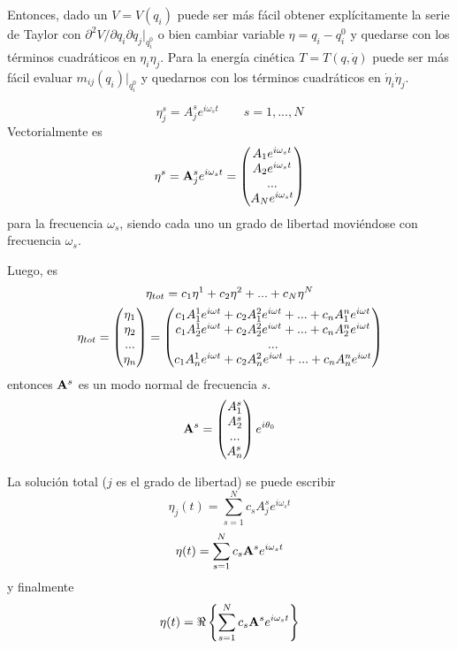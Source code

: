 \documentclass[10pt,oneside]{CBFT_book}
\begin{document}
Entonces, dado un $V=V(q_i)$ puede ser más fácil obtener explícitamente la serie de Taylor con 
$\partial^2 V/ \partial q_i \partial q_j |_{q_i^0}$ o bien cambiar variable $\eta = q_i - q_i^0$ y quedarse
con los términos cuadráticos en $\eta_i \eta_j$. Para la energía cinética $T=T(q,\dot{q})$ puede ser más
fácil evaluar $m_{ij}(q_i)|_{q_i^0}$ y quedarnos con los términos cuadráticos en $\dot{\eta}_i \dot{\eta}_j$.

\[
	\eta_j^s = A_j^s e^{i\omega_s t}	 \qquad s=1,...,N
\]
Vectorialmente es 
\[
	\vb{\eta}^s = \vb{A}_j^s e^{i\omega_s t} = \begin{pmatrix}
	                A_1 e^{i\omega_s t} \\
	                A_2 e^{i\omega_s t} \\
	                ... \\
	                A_N e^{i\omega_s t} \\
	               \end{pmatrix}
\]
para la frecuencia $\omega_s$, siendo cada uno un grado de libertad moviéndose con frecuencia $\omega_s$.

Luego, es
\[
	\vb{\eta}_{tot} = c_1 \vb{\eta}^1 + c_2 \vb{\eta}^2 + ... + c_N \vb{\eta}^N
\]
\[
	\vb{\eta}_{tot} = \begin{pmatrix}
				\eta_1 \\
				\eta_2 \\
				... \\
				\eta_n 
	                  \end{pmatrix}
	                 = \begin{pmatrix}
				c_1 A_1^1 e^{i\omega t} + c_2 A_1^2 e^{i\omega t} + ... + c_n A_1^n e^{i\omega t} \\
				c_1 A_2^1 e^{i\omega t} + c_2 A_2^2 e^{i\omega t} + ... + c_n A_2^n e^{i\omega t} \\
				... \\
				c_1 A_n^1 e^{i\omega t} + c_2 A_n^2 e^{i\omega t} + ... + c_n A_n^n e^{i\omega t}
	                  \end{pmatrix}
\]
entonces $\vb{A}^s$ es un modo normal de frecuencia $s$.
\[
	\vb{A}^s = \begin{pmatrix}
	            A_1^s \\
	            A_2^s \\
	            ... \\
	            A_n^s
	           \end{pmatrix}
	           e^{i\theta_0}
\]

La solución total ($j$ es el grado de libertad) se puede escribir 
\[
	\eta_j(t) = \sum_{s=1}^N c_s A_j^s e^{i\omega_s t}
\]
\[
	\vb{\eta}(t) = \sum_{s=1}^N c_s \vb{A}^s e^{i\omega_s t}
\]
y finalmente 
\[
	\vb{\eta}(t) = \Re \left\{ \sum_{s=1}^N c_s \vb{A}^s e^{i\omega_s t} \right\}
\]
\end{document}
